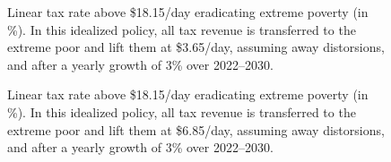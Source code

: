 \begin{figure}[!htb]
  \caption[Anti-severe-poverty tax above \$18.15/day after 3\% growth (HFCE-scaled).]{Linear tax rate above \$18.15/day eradicating extreme poverty (in \%). In this idealized policy, all tax revenue is transferred to the extreme poor and lift them at \$3.65/day, assuming away distorsions, and after a yearly growth of 3\% over 2022--2030. 
  }\label{fig:antipoverty_4_tax_18_average}
\end{figure}

\begin{figure}[!htb]
  \caption[Anti-acute-poverty tax above \$18.15/day after 3\% growth (HFCE-scaled).]{Linear tax rate above \$18.15/day eradicating extreme poverty (in \%). In this idealized policy, all tax revenue is transferred to the extreme poor and lift them at \$6.85/day, assuming away distorsions, and after a yearly growth of 3\% over 2022--2030. 
  }\label{fig:antipoverty_7_tax_18_average}
\end{figure}

